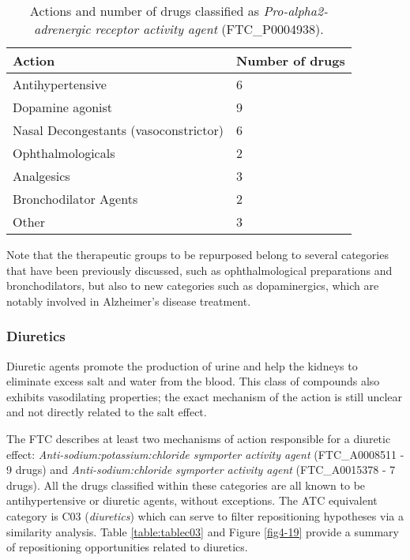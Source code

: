 \begin{table}[htbp]
\small
\begin{tabular}{|p{5cm}|p{5cm}|}
\hline
\textbf{Action} & \textbf{Number of drugs} \\ \hline
Antihypertensive  & 6 \\ \hline
Dopamine agonist & 9 \\ \hline
Nasal Decongestants (vasoconstrictor) & 6 \\ \hline
Ophthalmologicals & 2 \\ \hline
Analgesics & 3 \\ \hline
Bronchodilator Agents & 2 \\ \hline
Other & 3 \\ \hline
\end{tabular}
\caption{Actions and number of drugs classified as \emph{Pro-alpha2-adrenergic receptor activity agent} (FTC\_P0004938).}
\label{table:tablealpha}
\end{table}

Note that the therapeutic groups to be repurposed belong to several categories that have been previously discussed, such as ophthalmological preparations and bronchodilators, but also to new categories such as dopaminergics, which are notably involved in Alzheimer's disease treatment.

\subsubsection{Diuretics}
Diuretic agents promote the production of urine and help the kidneys to eliminate excess salt and water from the blood. This class of compounds also exhibits vasodilating properties; the exact mechanism of the action is still unclear and not directly related to the salt effect.

The FTC describes at least two mechanisms of action responsible for a diuretic effect: \emph{Anti-sodium:potassium:chloride symporter activity agent} (FTC\_A0008511 - 9 drugs) and \emph{Anti-sodium:chloride symporter activity agent} (FTC\_A0015378 - 7 drugs). All the drugs classified within these categories are all known to be antihypertensive or diuretic agents, without exceptions. The ATC equivalent category is C03 (\emph{diuretics}) which can serve to filter repositioning hypotheses via a similarity analysis. Table \ref{table:tablec03} and Figure \ref{fig4-19} provide a summary of repositioning opportunities related to diuretics.

